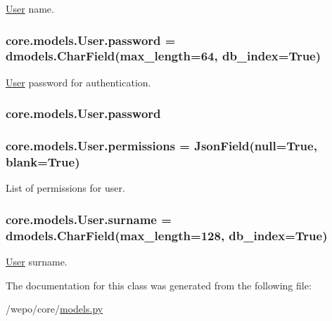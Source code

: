\hyperlink{classcore_1_1models_1_1User}{User} name. 

\hypertarget{classcore_1_1models_1_1User_a7d320bc1c53745b1f8ca4f91e3cc19ea}{
\subsubsection[{password}]{\setlength{\rightskip}{0pt plus 5cm}core.\-models.\-User.\-password = dmodels.\-Char\-Field(max\-\_\-length=64, db\-\_\-index=True)\hspace{0.3cm}{\ttfamily [static]}}}\label{classcore_1_1models_1_1User_a7d320bc1c53745b1f8ca4f91e3cc19ea}


\hyperlink{classcore_1_1models_1_1User}{User} password for authentication. 

\hypertarget{classcore_1_1models_1_1User_a7d320bc1c53745b1f8ca4f91e3cc19ea}{
\subsubsection[{password}]{\setlength{\rightskip}{0pt plus 5cm}core.\-models.\-User.\-password}}\label{classcore_1_1models_1_1User_a7d320bc1c53745b1f8ca4f91e3cc19ea}
\hypertarget{classcore_1_1models_1_1User_a784eb0d695f930aeb18eeb4f7f8a166e}{
\subsubsection[{permissions}]{\setlength{\rightskip}{0pt plus 5cm}core.\-models.\-User.\-permissions = {\bf Json\-Field}(null=True, blank=True)\hspace{0.3cm}{\ttfamily [static]}}}\label{classcore_1_1models_1_1User_a784eb0d695f930aeb18eeb4f7f8a166e}


List of permissions for user. 

\hypertarget{classcore_1_1models_1_1User_a3804f136ea7cba3a9611f8432450ed4c}{
\subsubsection[{surname}]{\setlength{\rightskip}{0pt plus 5cm}core.\-models.\-User.\-surname = dmodels.\-Char\-Field(max\-\_\-length=128, db\-\_\-index=True)\hspace{0.3cm}{\ttfamily [static]}}}\label{classcore_1_1models_1_1User_a3804f136ea7cba3a9611f8432450ed4c}


\hyperlink{classcore_1_1models_1_1User}{User} surname. 



The documentation for this class was generated from the following file\-:\begin{DoxyCompactItemize}
\item 
/wepo/core/\hyperlink{models_8py}{models.\-py}\end{DoxyCompactItemize}
